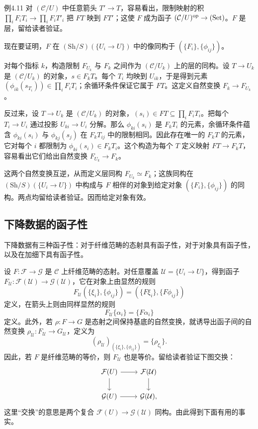 \begin{origstatement}{例}{4.11}
对 $(\mathcal C/U)$ 中任意箭头 $T'\to T$，容易看出，限制映射的积 $\prod_i F_iT_i\to\prod_i F_iT'_i$ 把 $FT$ 映到 $FT'$；这使 $F$ 成为函子 $(\mathcal C/U)^{\mathrm{op}}\to(\mathrm{Set})$。$F$ 是层，留给读者验证。

现在要证明，$F$ 在 $(\mathrm{Sh}/S)(\{U_i\to U\})$ 中的像同构于 $(\{F_i\},\{\phi_{ij}\})$。

对每个指标 $k$，构造限制 $F_{U_k}$ 与 $F_k$ 之间作为 $(\mathcal C/U_k)$ 上的层的同构。设 $T\to U_k$ 是 $(\mathcal C/U_k)$ 的对象，$s\in F_kT$。每个 $T_i$ 均映到 $U_{ik}$，于是得到元素 $(\phi_{ik}(s_{T_i}))\in\prod_i F_iT_i$；余循环条件保证它属于 $FT$。这定义自然变换 $F_k\to F_{U_k}$。

反过来，设 $T\to U_k$ 是 $(\mathcal C/U_k)$ 的对象，$(s_i)\in FT\subseteq\prod_i F_iT_i$。把每个 $T_i\to U_i$ 通过投影 $U_{ki}\to U_i$ 分解。那么 $\phi_{ki}(s_i)$ 是 $F_kT_i$ 的元素，余循环条件蕴含 $\phi_{ki}(s_i)$ 与 $\phi_{kj}(s_j)$ 在 $F_kT_{ij}$ 中的限制相同。因此存在唯一的 $F_kT$ 的元素，它对每个 $i$ 都限制为 $\phi_{ki}(s_i)\in F_kT_i$。这个构造为每个 $T$ 定义映射 $FT\to F_kT$，容易看出它们给出自然变换 $F_{U_k}\to F_k$。

这两个自然变换互逆，从而定义层同构 $F_{U_k}\simeq F_k$；这族同构在 $(\mathrm{Sh}/S)(\{U_i\to U\})$ 中构成与 $F$ 相伴的对象到给定对象 $(\{F_i\},\{\phi_{ij}\})$ 的同构。两点均留给读者验证。因而给定对象有效。
\end{origstatement}

\subsection{下降数据的函子性}
下降数据有三种函子性：对于纤维范畴的态射具有函子性，对于对象具有函子性，以及在加细下具有函子性。

设 $F\colon\mathcal F\to\mathcal G$ 是 $\mathcal C$ 上纤维范畴的态射。对任意覆盖 $\mathcal U=\{U_i\to U\}$，得到函子 $F_{\mathcal U}\colon\mathcal F(\mathcal U)\to\mathcal G(\mathcal U)$，它在对象上由显然的规则
\[
 F_{\mathcal U}(\{\xi_i\},\{\phi_{ij}\})=(\{F\xi_i\},\{F\phi_{ij}\})
\]
定义，在箭头上则由同样显然的规则
\[
 F_{\mathcal U}\{\alpha_i\}=\{F\alpha_i\}
\]
定义。此外，若 $\rho\colon F\to G$ 是态射之间保持基底的自然变换，就诱导出函子间的自然变换 $\rho_{\mathcal U}\colon F_{\mathcal U}\to G_{\mathcal U}$，定义为
\[
 (\rho_{\mathcal U})_{(\{\xi_i\},\{\phi_{ij}\})}=\{\rho_{\xi_i}\}.
\]
因此，若 $F$ 是纤维范畴的等价，则 $F_{\mathcal U}$ 也是等价。留给读者验证下图交换：
\[
\begin{tikzcd}
 \mathcal F(U)\arrow[r]\arrow[d]&\mathcal F(\mathcal U)\arrow[d]\\
 \mathcal G(U)\arrow[r]&\mathcal G(\mathcal U),
\end{tikzcd}
\]
这里“交换”的意思是两个复合 $\mathcal F(U)\to\mathcal G(\mathcal U)$ 同构。由此得到下面有用的事实。

